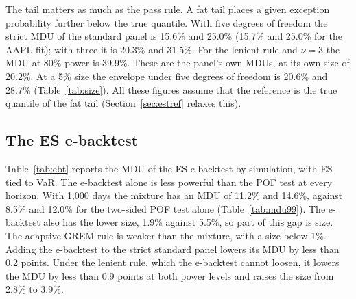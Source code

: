 \documentclass[11pt]{article}
\begin{document}
The tail matters as much as the pass rule. A fat tail places a given exception
probability further below the true quantile. With five degrees of freedom the
strict MDU of the standard panel is 15.6\% and 25.0\% (15.7\% and 25.0\% for
the AAPL fit); with three it is 20.3\% and 31.5\%. For the lenient rule and
$\nu = 3$ the MDU at 80\% power is 39.9\%. These are the panel's own MDUs, at
its own size of 20.2\%. At a 5\% size the envelope under five degrees of
freedom is 20.6\% and 28.7\% (Table~\ref{tab:size}).
All these figures assume that the reference is the true quantile of the fat
tail (Section~\ref{sec:estref} relaxes this).

\subsection{The ES e-backtest}

Table~\ref{tab:ebt} reports the MDU of the ES e-backtest by simulation, with ES
tied to VaR. The e-backtest alone is less powerful than the POF test at every
horizon. With 1,000 days the mixture has an MDU of 11.2\% and 14.6\%, against
8.5\% and 12.0\% for the two-sided POF test alone (Table~\ref{tab:mdu99}). The
e-backtest also has the lower size, 1.9\% against 5.5\%, so part of this gap is
size. The adaptive GREM rule is weaker than the mixture, with a size below 1\%. Adding the e-backtest to the strict standard panel lowers its MDU by
less than 0.2 points. Under the lenient rule, which the e-backtest cannot
loosen, it lowers the MDU by less than 0.9 points at both power levels and raises the
size from 2.8\% to 3.9\%.
\end{document}
